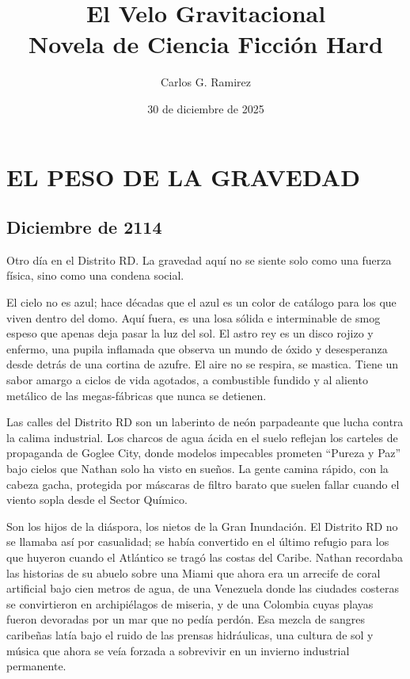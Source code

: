 \documentclass[12pt,a4paper]{book}
\title{\textbf{El Velo Gravitacional}\\[0.5cm]\large Novela de Ciencia Ficción Hard}
\author{Carlos G. Ramirez}
\date{30 de diciembre de 2025}
\begin{document}
\maketitle
\frontmatter
\tableofcontents
\newpage
\mainmatter

\chapter{EL PESO DE LA GRAVEDAD}

\section*{Diciembre de 2114}

Otro día en el Distrito RD. La gravedad aquí no se siente solo como una fuerza física, sino como una condena social.

El cielo no es azul; hace décadas que el azul es un color de catálogo para los que viven dentro del domo. Aquí fuera, es una losa sólida e interminable de smog espeso que apenas deja pasar la luz del sol. El astro rey es un disco rojizo y enfermo, una pupila inflamada que observa un mundo de óxido y desesperanza desde detrás de una cortina de azufre. El aire no se respira, se mastica. Tiene un sabor amargo a ciclos de vida agotados, a combustible fundido y al aliento metálico de las megas-fábricas que nunca se detienen.

Las calles del Distrito RD son un laberinto de neón parpadeante que lucha contra la calima industrial. Los charcos de agua ácida en el suelo reflejan los carteles de propaganda de Goglee City, donde modelos impecables prometen ``Pureza y Paz'' bajo cielos que Nathan solo ha visto en sueños. La gente camina rápido, con la cabeza gacha, protegida por máscaras de filtro barato que suelen fallar cuando el viento sopla desde el Sector Químico.

Son los hijos de la diáspora, los nietos de la Gran Inundación. El Distrito RD no se llamaba así por casualidad; se había convertido en el último refugio para los que huyeron cuando el Atlántico se tragó las costas del Caribe. Nathan recordaba las historias de su abuelo sobre una Miami que ahora era un arrecife de coral artificial bajo cien metros de agua, de una Venezuela donde las ciudades costeras se convirtieron en archipiélagos de miseria, y de una Colombia cuyas playas fueron devoradas por un mar que no pedía perdón. Esa mezcla de sangres caribeñas latía bajo el ruido de las prensas hidráulicas, una cultura de sol y música que ahora se veía forzada a sobrevivir en un invierno industrial permanente.
\end{document}

